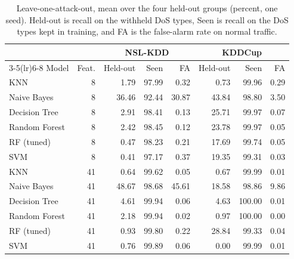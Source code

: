 \begin{table}[t]
\centering
\caption{Leave-one-attack-out, mean over the four held-out groups (percent, one seed). Held-out is recall on the withheld DoS types, Seen is recall on the DoS types kept in training, and FA is the false-alarm rate on normal traffic.}
\label{tab:loao}
\footnotesize
\setlength{\tabcolsep}{2.5pt}
\begin{tabular}{lrrrrrrr}
\toprule
 & & \multicolumn{3}{c}{NSL-KDD} & \multicolumn{3}{c}{KDDCup} \\
\cmidrule(lr){3-5}\cmidrule(lr){6-8}
Model & Feat. & Held-out & Seen & FA & Held-out & Seen & FA \\
\midrule
KNN & 8 & 1.79 & 97.99 & 0.32 & 0.73 & 99.96 & 0.29 \\
Naive Bayes & 8 & 36.46 & 92.44 & 30.87 & 43.84 & 98.80 & 3.50 \\
Decision Tree & 8 & 2.91 & 98.41 & 0.13 & 25.71 & 99.97 & 0.07 \\
Random Forest & 8 & 2.42 & 98.45 & 0.12 & 23.78 & 99.97 & 0.05 \\
RF (tuned) & 8 & 0.47 & 98.23 & 0.21 & 17.69 & 99.74 & 0.05 \\
SVM & 8 & 0.41 & 97.17 & 0.37 & 19.35 & 99.31 & 0.03 \\
\midrule
KNN & 41 & 0.64 & 99.62 & 0.05 & 0.67 & 99.99 & 0.01 \\
Naive Bayes & 41 & 48.67 & 98.68 & 45.61 & 18.58 & 98.86 & 9.86 \\
Decision Tree & 41 & 4.61 & 99.94 & 0.06 & 4.63 & 100.00 & 0.01 \\
Random Forest & 41 & 2.18 & 99.94 & 0.02 & 0.97 & 100.00 & 0.00 \\
RF (tuned) & 41 & 0.93 & 99.80 & 0.22 & 28.84 & 99.33 & 0.04 \\
SVM & 41 & 0.76 & 99.89 & 0.06 & 0.00 & 99.99 & 0.01 \\
\bottomrule
\end{tabular}
\end{table}
